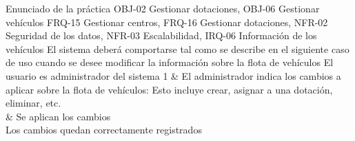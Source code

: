 {\reportauthors}
{Enunciado de la práctica}
{OBJ-02 Gestionar dotaciones, OBJ-06 Gestionar vehículos}
{FRQ-15 Gestionar centros, FRQ-16 Gestionar dotaciones, NFR-02 Seguridad de los datos, NFR-03 Escalabilidad, IRQ-06 Información de los vehículos}
{El sistema deberá comportarse tal como se describe en el siguiente caso de uso cuando se desee modificar la información sobre la flota de vehículos}
{El usuario es administrador del sistema}
{
1 & El administrador indica los cambios a aplicar sobre la flota de vehículos: Esto incluye crear, asignar a una dotación, eliminar, etc. \\  & Se aplican los cambios \\
}
{Los cambios quedan correctamente registrados}
{}

